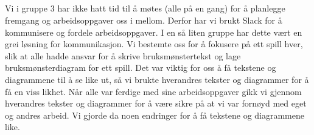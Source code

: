 \documentclass[11pt]{meetingmins}
\begin{document}
\maketitle
\subsection{}
Vi i gruppe 3 har ikke hatt tid til å møtes (alle på en gang) for å planlegge fremgang og arbeidsoppgaver oss i mellom. Derfor har vi brukt Slack for å kommunisere og fordele arbeidsoppgaver. I en så liten gruppe har dette vært en grei løsning for kommunikasjon. Vi bestemte oss for å fokusere på ett spill hver, slik at alle hadde ansvar for å skrive bruksmønstertekst og lage bruksmønsterdiagram for ett spill. Det var viktig for oss å få tekstene og diagrammene til å se like ut, så vi brukte hverandres tekster og diagrammer for å få en viss likhet. Når alle var ferdige med sine arbeidsoppgaver gikk vi gjennom hverandres tekster og diagrammer for å være sikre på at vi var fornøyd med eget og andres arbeid. Vi gjorde da noen endringer for å få tekstene og diagrammene like.
\end{document}
